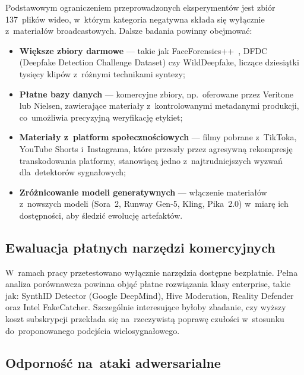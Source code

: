 Podstawowym ograniczeniem przeprowadzonych eksperyment\'{o}w
jest zbi\'{o}r 137~plik\'{o}w wideo, w~kt\'{o}rym kategoria negatywna
sk\l{}ada si\k{e} wy\l{}\k{a}cznie z~materia\l{}\'{o}w broadcastowych.
Dalsze badania powinny obejmowa\'{c}:

\begin{itemize}
  \item \textbf{Wi\k{e}ksze zbiory darmowe} --- takie jak FaceForensics++~\cite{Rossler2019FaceForensics},
        DFDC (Deepfake Detection Challenge Dataset) czy WildDeepfake, licz\k{a}ce dziesi\k{a}tki
        tysi\k{e}cy klip\'{o}w z~r\'{o}\.{z}nymi technikami syntezy;
  \item \textbf{P\l{}atne bazy danych} --- komercyjne zbiory, np.\ oferowane przez Veritone
        lub Nielsen, zawieraj\k{a}ce materia\l{}y z~kontrolowanymi metadanymi produkcji,
        co~umo\.{z}liwia precyzyjn\k{a} weryfikacj\k{e} etykiet;
  \item \textbf{Materia\l{}y z~platform spo\l{}eczno\'{s}ciowych} --- filmy pobrane z~TikToka,
        YouTube Shorts i~Instagrama, kt\'{o}re przesz\l{}y przez agresywn\k{a} rekompresj\k{e}
        transkodowania platformy, stanowi\k{a}c\k{a} jedno z~najtrudniejszych wyzwa\'{n}
        dla~detektor\'{o}w sygna\l{}owych;
  \item \textbf{Zr\'{o}\.{z}nicowanie modeli generatywnych} --- w\l{}\k{a}czenie materia\l{}\'{o}w
        z~nowszych modeli (Sora~2, Runway Gen-5, Kling, Pika~2.0) w~miar\k{e}
        ich dost\k{e}pno\'{s}ci, aby \'{s}ledzi\'{c} ewolucj\k{e} artefakt\'{o}w.
\end{itemize}

\subsection{Ewaluacja p\l{}atnych narz\k{e}dzi komercyjnych}

W~ramach pracy przetestowano wy\l{}\k{a}cznie narz\k{e}dzia dost\k{e}pne bezp\l{}atnie.
Pe\l{}na analiza por\'{o}wnawcza powinna obj\k{a}\'{c} p\l{}atne rozwi\k{a}zania klasy enterprise,
takie jak: SynthID Detector (Google DeepMind), Hive Moderation, Reality Defender
oraz Intel FakeCatcher. Szczeg\'{o}lnie interesuj\k{a}ce by\l{}oby zbadanie,
czy wy\.{z}szy koszt subskrypcji przek\l{}ada si\k{e} na~rzeczywist\k{a} popraw\k{e}
czu\l{}o\'{s}ci w~stosunku do~proponowanego podej\'{s}cia wielosygna\l{}owego.

\subsection{Odporno\'{s}\'{c} na~ataki adwersarialne}

